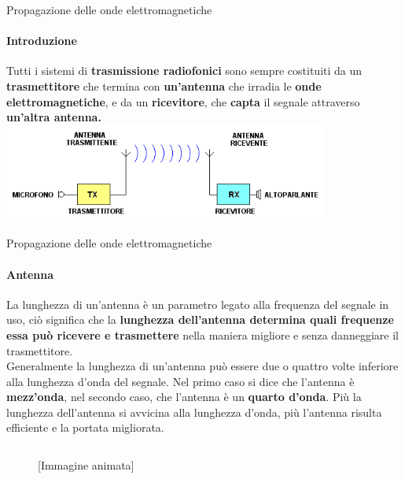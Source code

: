\documentclass[aspectratio=169]{beamer}
\begin{document}
\begin{frame}{Propagazione delle onde elettromagnetiche}
	\framesubtitle{Introduzione}
	Tutti i sistemi di \textbf{trasmissione radiofonici} sono sempre costituiti da un \textbf{trasmettitore} che termina con \textbf{un'antenna} che irradia le \textbf{onde elettromagnetiche}, e da un \textbf{ricevitore}, che \textbf{capta} il segnale attraverso \textbf{un'altra antenna.}\\
	\smallskip
	\centering
		\includegraphics[width=0.8\textwidth]{Imgs/Radio}
\end{frame}

\begin{frame}{Propagazione delle onde elettromagnetiche}
	\framesubtitle{Antenna}
	La lunghezza di un'antenna è un parametro legato alla frequenza del segnale in uso, ciò significa che la \textbf{lunghezza dell'antenna determina quali frequenze essa può ricevere e trasmettere} nella maniera migliore e senza danneggiare il trasmettitore.\\
	\smallskip
	Generalmente la lunghezza di un'antenna può essere due o quattro volte inferiore alla lunghezza d'onda del segnale. Nel primo caso si dice che l'antenna è \textbf{mezz'onda}, nel secondo caso, che l'antenna è un \textbf{quarto d'onda}. Più la lunghezza dell'antenna si avvicina alla lunghezza d'onda, più l'antenna risulta efficiente e la portata migliorata.
	\begin{figure}
		\begin{columns}
			\hfill
			\qquad \tiny{\textcolor{gray!80}{[Immagine animata]}}
		\end{columns}
	\end{figure}
\end{frame}
\end{document}
